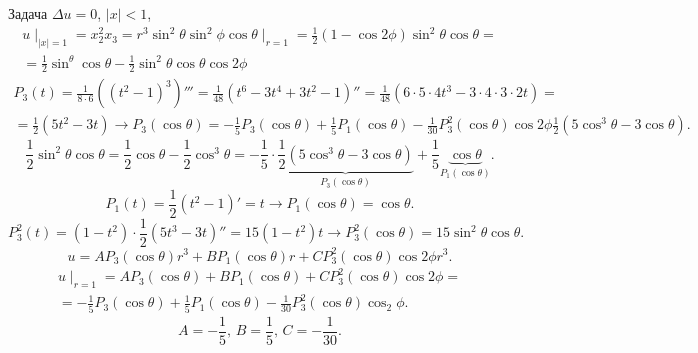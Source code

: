 \documentclass[a4paper]{article}
\begin{document}
Задача $\Delta u = 0$, $|x|<1$,  \begin{multline*}u\mid _{|x|=1}=x^2_2 x_3=r^3
 \sin^2 \theta \sin^2 \phi \cos \theta\mid _{r=1}=\frac{1}{2}
 (1-\cos 2\phi) \sin^2 \theta \cos \theta =\\= \frac{1}{2}\sin^\theta
 \cos\theta - \frac{1}{2 }\sin^2 \theta \cos\theta \cos 2\phi\end{multline*}
 \begin{multline*}
	 P_3 (t) = \frac{1}{8 \cdot 6} \left( (t^2-1)^3 \right) '''=
	 \frac{1}{48} (t^6 -3 t^4 +3t^2-1)''=
	 \frac{1}{48}(6 \cdot 5 \cdot 4 t^3 - 3 \cdot 4 \cdot 3
	 \cdot 2 t)=\\= \frac{1}{2} (5 t^2 - 3t) \to  P_3 (\cos\theta)= -\frac{1}{5} P_3 (\cos\theta) +\frac{1}{5}P_1 (\cos\theta) -\frac{1}{30}P_3^2 (\cos\theta) \cos 2 \phi
	 \frac{1}{2} (5 \cos^3 \theta -3 \cos \theta)
 .\end{multline*} 
 \[
 \frac{1}{2} \sin^2 \theta \cos\theta = \frac{1}{2}
 \cos \theta - \frac{1}{2} \cos^3 \theta=
 -\frac{1}{5} \cdot \underbrace{\frac{1}{2} (5 \cos^3 \theta- 3 \cos \theta)}_{P_3(\cos\theta)}+
 \frac{1}{5} \underbrace{\cos \theta}_{P_1(\cos\theta)}
 .\] 
 \[
	 P_1(t)= \frac{1}{2}(t^2 -1)'= t \to  P_1 (\cos\theta)=\cos \theta
 .\] 
 \[
	 P^2_3(t)= (1 - t^2)\cdot \frac{1}{2}(5t^3 - 3t)''=
	 15 (1-t^2)t\to  P^2_3 (\cos \theta)= 15 \sin^2 \theta
	 \cos \theta
 .\] 
 \[
	 u= A P_3 (\cos \theta) r^3 + B P_1 ( \cos \theta)r +
	 C P_3^2 (\cos\theta) \cos 2\phi r^3
 .\] 
 \begin{multline*}
	 u\mid _{r=1}=AP_3(\cos\theta) + B P_1 (\cos\theta)+C
	 P_3^2 (\cos\theta) \cos 2\phi =\\= -\frac{1}{5} P_3 (\cos\theta) + \frac{1}{5}P_1 (\cos\theta)- \frac{1}{30 } P_3 ^2 (\cos\theta)
	 \cos_2\phi
 .\end{multline*} 
 \[
 A=-\frac{1}{5},\, B=\frac{1}{5},\, C= - \frac{1}{30}
 .\] 
\end{document}
